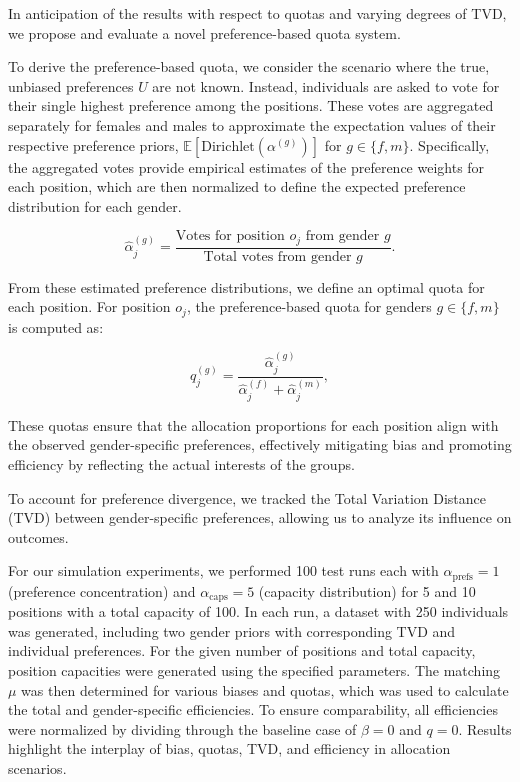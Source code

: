 \documentclass[letterpaper]{article}
\begin{document}
In anticipation of the results with respect to quotas and varying degrees of TVD, we propose and evaluate a novel preference-based quota system.

To derive the preference-based quota, we consider the scenario where the true, unbiased preferences \( U \) are not known. Instead, individuals are asked to vote for their single highest preference among the positions. These votes are aggregated separately for females and males to approximate the expectation values of their respective preference priors, \( \mathbb{E}[\textrm{Dirichlet}(\alpha^{(g)})] \) for \( g\in\{f, m\} \). Specifically, the aggregated votes provide empirical estimates of the preference weights for each position, which are then normalized to define the expected preference distribution for each gender.

\[
\hat{\alpha}^{(g)}_j = \frac{\text{Votes for position } o_j \text{ from gender } g}{\text{Total votes from gender } g}.
\]

From these estimated preference distributions, we define an optimal quota for each position. For position \( o_j \), the preference-based quota for genders \( g\in\{f, m\} \) is computed as:

\[
q_j^{(g)} = \frac{\hat{\alpha}^{(g)}_j}{\hat{\alpha}^{(f)}_j + \hat{\alpha}^{(m)}_j},
\]

These quotas ensure that the allocation proportions for each position align with the observed gender-specific preferences, effectively mitigating bias and promoting efficiency by reflecting the actual interests of the groups.

To account for preference divergence, we tracked the Total Variation Distance (TVD) between gender-specific preferences, allowing us to analyze its influence on outcomes. 

For our simulation experiments, we performed 100 test runs each with \( \alpha_\text{prefs} = 1 \) (preference concentration) and \( \alpha_\text{caps} = 5 \) (capacity distribution) for 5 and 10 positions with a total capacity of 100. In each run, a dataset with 250 individuals was generated, including two gender priors with corresponding TVD and individual preferences. For the given number of positions and total capacity, position capacities were generated using the specified parameters. The matching \( \mu \) was then determined for various biases and quotas, which was used to calculate the total and gender-specific efficiencies. To ensure comparability, all efficiencies were normalized by dividing through the baseline case of \( \beta = 0 \) and \( q = 0 \). Results highlight the interplay of bias, quotas, TVD, and efficiency in allocation scenarios.
\end{document}

